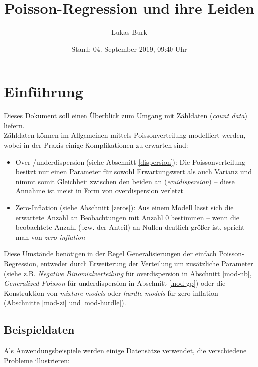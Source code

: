 \documentclass[ngerman,a4paper,]{scrartcl}
\title{Poisson-Regression und ihre Leiden}
\author{Lukas Burk}
\date{Stand: 04. September 2019, 09:40 Uhr}
\providecommand{\tightlist}{%
  \setlength{\itemsep}{0pt}\setlength{\parskip}{0pt}}
\theoremstyle{definition}
\theoremstyle{definition}
\theoremstyle{definition}
\theoremstyle{remark}
\begin{document}
\maketitle

{
\hypersetup{linkcolor=black}
\setcounter{tocdepth}{2}
\tableofcontents
}
\hypertarget{einfuhrung}{%
\section{Einführung}\label{einfuhrung}}

Dieses Dokument soll einen Überblick zum Umgang mit Zähldaten (\emph{count data}) liefern.\\
Zähldaten können im Allgemeinen mittels Poissonverteilung modelliert werden, wobei in der Praxis einige Komplikationen zu erwarten sind:

\begin{itemize}
\tightlist
\item
  Over-/underdispersion (siehe Abschnitt \ref{dispersion}): Die Poissonverteilung besitzt nur einen Parameter für sowohl Erwartungswert als auch Varianz und nimmt somit Gleichheit zwischen den beiden an (\emph{equidispersion}) -- diese Annahme ist meist in Form von overdispersion verletzt
\item
  Zero-Inflation (siehe Abschnitt \ref{zeros}): Aus einem Modell lässt sich die erwartete Anzahl an Beobachtungen mit Anzahl \(0\) bestimmen -- wenn die beobachtete Anzahl (bzw. der Anteil) an Nullen deutlich größer ist, spricht man von \emph{zero-inflation}
\end{itemize}

Diese Umstände benötigen in der Regel Generalisierungen der einfach Poisson-Regression, entweder durch Erweiterung der Verteilung um zusätzliche Parameter (siehe z.B. \emph{Negative Binomialverteilung} für overdispersion in Abschnitt \ref{mod-nb}, \emph{Generalized Poisson} für underdispersion in Abschnitt \ref{mod-gp}) oder die Konstruktion von \emph{mixture models} oder \emph{hurdle models} für zero-inflation (Abschnitte \ref{mod-zi} und \ref{mod-hurdle}).

\hypertarget{data}{%
\subsection{Beispieldaten}\label{data}}

Als Anwendungsbeispiele werden einige Datensätze verwendet, die verschiedene Probleme illustrieren:
\end{document}
